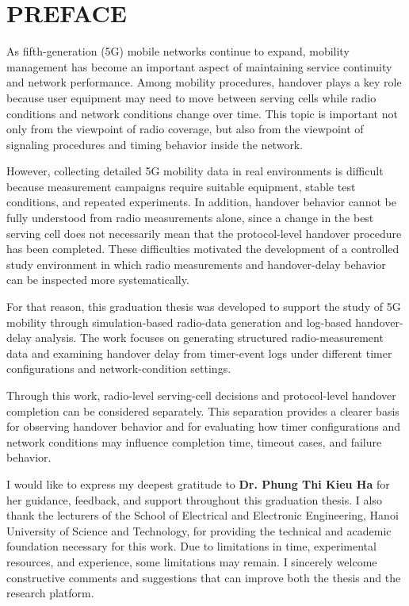 \section*{PREFACE}
\thispagestyle{empty}





As fifth-generation (5G) mobile networks continue to expand, mobility management has become an important aspect of maintaining service continuity and network performance. Among mobility procedures, handover plays a key role because user equipment may need to move between serving cells while radio conditions and network conditions change over time. This topic is important not only from the viewpoint of radio coverage, but also from the viewpoint of signaling procedures and timing behavior inside the network.

However, collecting detailed 5G mobility data in real environments is difficult because measurement campaigns require suitable equipment, stable test conditions, and repeated experiments. In addition, handover behavior cannot be fully understood from radio measurements alone, since a change in the best serving cell does not necessarily mean that the protocol-level handover procedure has been completed. These difficulties motivated the development of a controlled study environment in which radio measurements and handover-delay behavior can be inspected more systematically.

For that reason, this graduation thesis was developed to support the study of 5G mobility through simulation-based radio-data generation and log-based handover-delay analysis. The work focuses on generating structured radio-measurement data and examining handover delay from timer-event logs under different timer configurations and network-condition settings.

Through this work, radio-level serving-cell decisions and protocol-level handover completion can be considered separately. This separation provides a clearer basis for observing handover behavior and for evaluating how timer configurations and network conditions may influence completion time, timeout cases, and failure behavior.

I would like to express my deepest gratitude to \textbf{Dr. Phung Thi Kieu Ha} for her guidance, feedback, and support throughout this graduation thesis. I also thank the lecturers of the School of Electrical and Electronic Engineering, Hanoi University of Science and Technology, for providing the technical and academic foundation necessary for this work. Due to limitations in time, experimental resources, and experience, some limitations may remain. I sincerely welcome constructive comments and suggestions that can improve both the thesis and the research platform.

\clearpage
